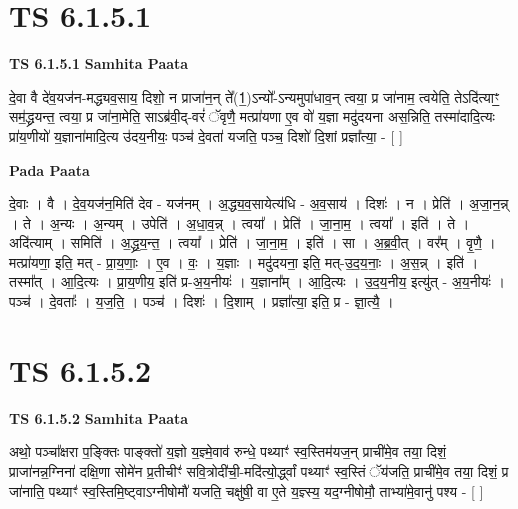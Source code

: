 \documentclass[17pt]{extarticle}
\begin{document}
\section*{ TS 6.1.5.1 }

\textbf{TS 6.1.5.1 } \newline
\textbf{Samhita Paata} \newline

दे॒वा वै दे॑व॒यज॑न-मद्ध्यव॒साय॒ दिशो॒ न प्राजा॑न॒न् ते᳚(1॒)ऽन्यो᳚-ऽन्यमुपा॑धाव॒न् त्वया॒ प्र जा॑नाम॒ त्वयेति॒ तेऽदि॑त्याꣳ॒॒ सम॒॑द्ध्रयन्त॒ त्वया॒ प्र जा॑ना॒मेति॒ साऽब्र॑वी॒द्-वरं॑ ॅवृणै॒ मत्प्रा॑यणा ए॒व वो॑ य॒ज्ञा मदु॑दयना अस॒न्निति॒ तस्मा॑दादि॒त्यः प्रा॑य॒णीयो॑ य॒ज्ञाना॑मादि॒त्य उ॑दय॒नीयः॒ पञ्च॑ दे॒वता॑ यजति॒ पञ्च॒ दिशो॑ दि॒शां प्रज्ञा᳚त्या॒ - [  ] \newline

\textbf{Pada Paata} \newline

दे॒वाः । वै । दे॒व॒यज॑न॒मिति॑ देव - यज॑नम् । अ॒द्ध्य॒व॒सायेत्य॑धि - अ॒व॒साय॑ । दिशः॑ । न । प्रेति॑ । अ॒जा॒न॒न्न् । ते । अ॒न्यः । अ॒न्यम् । उपेति॑ । अ॒धा॒व॒न्न् । त्वया᳚ । प्रेति॑ । जा॒ना॒म॒ । त्वया᳚ । इति॑ । ते । अदि॑त्याम् । समिति॑ । अ॒द्ध्र॒य॒न्त॒ । त्वया᳚ । प्रेति॑ । जा॒ना॒म॒ । इति॑ । सा । अ॒ब्र॒वी॒त् । वर᳚म् । वृ॒णै॒ । मत्प्रा॑यणा॒ इति॒ मत् - प्रा॒य॒णाः॒ । ए॒व । वः॒ । य॒ज्ञाः । मदु॑दयना॒ इति॒ मत्-उ॒द॒य॒नाः॒ । अ॒स॒न्न् । इति॑ । तस्मा᳚त् । आ॒दि॒त्यः । प्रा॒य॒णीय॒ इति॑ प्र-अ॒य॒नीयः॑ । य॒ज्ञाना᳚म् । आ॒दि॒त्यः । उ॒द॒य॒नीय॒ इत्यु॑त् - अ॒य॒नीयः॑ । पञ्च॑ । दे॒वताः᳚ । य॒ज॒ति॒ । पञ्च॑ । दिशः॑ । दि॒शाम् । प्रज्ञा᳚त्या॒ इति॒ प्र - ज्ञा॒त्यै॒ ।  \newline




\section*{ TS 6.1.5.2 }

\textbf{TS 6.1.5.2 } \newline
\textbf{Samhita Paata} \newline

अथो॒ पञ्चा᳚क्षरा प॒ङ्क्तिः पाङ्क्तो॑ य॒ज्ञो य॒ज्ञ्मे॒वाव॑ रुन्धे॒ पथ्याꣳ॑ स्व॒स्तिम॑यज॒न् प्राची॑मे॒व तया॒ दिशं॒ प्राजा॑नन्न॒ग्निना॑ दक्षि॒णा सोमे॑न प्र॒तीचीꣳ॑ सवि॒त्रोदी॑ची॒-मदि॑त्यो॒र्द्ध्वां पथ्याꣳ॑ स्व॒स्तिं  ॅय॑जति॒ प्राची॑मे॒व तया॒ दिशं॒ प्र जा॑नाति॒ पथ्याꣳ॑ स्व॒स्तिमि॒ष्ट्वाऽग्नीषोमौ॑ यजति॒ चक्षु॑षी॒ वा ए॒ते य॒ज्ञ्स्य॒ यद॒ग्नीषोमौ॒ ताभ्या॑मे॒वानु॑ पश्य - [  ] \newline
\end{document}
